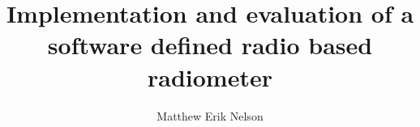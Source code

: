 \title{Implementation and evaluation of a software defined radio based radiometer}
\author{Matthew Erik Nelson}
\notice
\maketitle
